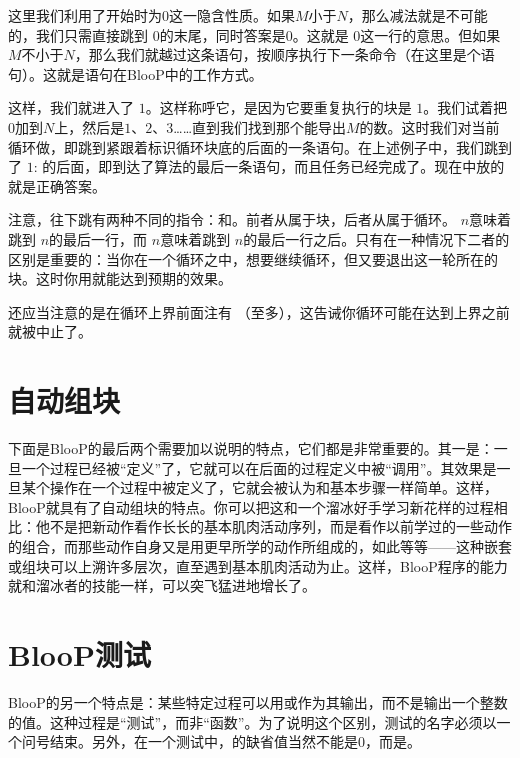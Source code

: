 这里我们利用了开始时为$0$这一隐含性质。如果$M$小于$N$，那么减法就是不可能的，我们只需直接跳到 $0$的末尾，同时答案是$0$。这就是  $0$这一行的意思。但如果$M$不小于$N$，那么我们就越过这条语句，按顺序执行下一条命令（在这里是个语句）。这就是语句在BlooP中的工作方式。

这样，我们就进入了 $1$。这样称呼它，是因为它要重复执行的块是 $1$。我们试着把$0$加到$N$上，然后是$1$、$2$、$3$……直到我们找到那个能导出$M$的数。这时我们对当前循环做，即跳到紧跟着标识循环块底的后面的一条语句。在上述例子中，我们跳到了 $1$: 的后面，即到达了算法的最后一条语句，而且任务已经完成了。现在中放的就是正确答案。

注意，往下跳有两种不同的指令：和。前者从属于块，后者从属于循环。  $n$意味着跳到 $n$的最后一行，而  $n$意味着跳到 $n$的最后一行之后。只有在一种情况下二者的区别是重要的：当你在一个循环之中，想要继续循环，但又要退出这一轮所在的块。这时你用就能达到预期的效果。

还应当注意的是在循环上界前面注有 （至多），这告诫你循环可能在达到上界之前就被中止了。

\section{自动组块}

下面是BlooP的最后两个需要加以说明的特点，它们都是非常重要的。其一是：一旦一个过程已经被“定义”了，它就可以在后面的过程定义中被“调用”。其效果是一旦某个操作在一个过程中被定义了，它就会被认为和基本步骤一样简单。这样，BlooP就具有了自动组块的特点。你可以把这和一个溜冰好手学习新花样的过程相比：他不是把新动作看作长长的基本肌肉活动序列，而是看作以前学过的一些动作的组合，而那些动作自身又是用更早所学的动作所组成的，如此等等——这种嵌套或组块可以上溯许多层次，直至遇到基本肌肉活动为止。这样，BlooP程序的能力就和溜冰者的技能一样，可以突飞猛进地增长了。

\section{BlooP测试}

BlooP的另一个特点是：某些特定过程可以用或作为其输出，而不是输出一个整数的值。这种过程是“测试”，而非“函数”。为了说明这个区别，测试的名字必须以一个问号结束。另外，在一个测试中，的缺省值当然不能是$0$，而是。

